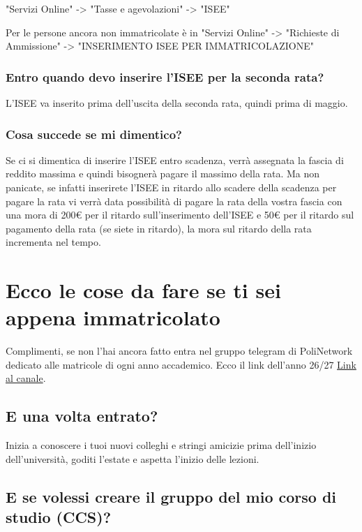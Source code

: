 \documentclass[legal]{polinetwork}
\begin{document}
"Servizi Online" -> "Tasse e agevolazioni" -> "ISEE"

Per le persone ancora non immatricolate è in "Servizi Online" -> "Richieste di Ammissione" -> "INSERIMENTO ISEE PER IMMATRICOLAZIONE"

\subsubsection{Entro quando devo inserire l'ISEE per la seconda rata?}


L'ISEE va inserito prima dell'uscita della seconda rata, quindi prima di maggio.

\subsubsection{Cosa succede se mi dimentico?}


Se ci si dimentica di inserire l'ISEE entro scadenza, verrà assegnata la fascia di reddito massima e quindi bisognerà pagare il massimo della rata. Ma non panicate, se infatti inserirete l'ISEE in ritardo allo scadere della scadenza per pagare la rata vi verrà data possibilità di pagare la rata della vostra fascia con una mora di 200€ per il ritardo sull'inserimento dell'ISEE e 50€ per il ritardo sul pagamento della rata (se siete in ritardo), la mora sul ritardo della rata incrementa nel tempo.

\section{Ecco le cose da fare se ti sei appena immatricolato}


Complimenti, se non l'hai ancora fatto entra nel gruppo telegram di PoliNetwork dedicato alle matricole di ogni anno accademico. Ecco il link dell'anno 26/27 \href{https://t.me/polimatricole}{Link al canale}.

\subsection{E una volta entrato?}


Inizia a conoscere i tuoi nuovi colleghi e stringi amicizie prima dell'inizio dell'università, goditi l'estate e aspetta l'inizio delle lezioni.

\subsection{E se volessi creare il gruppo del mio corso di studio (CCS)?}
\end{document}
